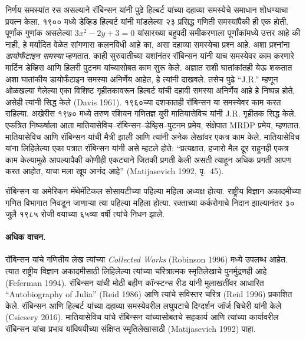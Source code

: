 निर्णय समस्यांत रस असल्याने रॉबिन्सन यांनी पुढे हिल्बर्ट यांच्या दहाव्या समस्येचे समाधान शोधण्याचा प्रयत्न केला. १९०० मध्ये डेव्हिड हिल्बर्ट यांनी मांडलेल्या २३ प्रसिद्ध गणिती समस्यांपैकी ही एक होती. पूर्णांक गुणांक असलेल्या $3x^2 - 2y +3 = 0$ यांसारख्या बहुपदी समीकरणाला पूर्णांकांमध्ये उत्तर आहे की नाही, हे मर्यादित वेळेत सांगणारा कलनविधी आहे का, असा दहाव्या समस्येचा प्रश्न आहे. अशा प्रश्नांना \emph{डायोफँटाइन समस्या} म्हणतात. काही सुरुवातीच्या यशांनंतर रॉबिन्सन यांनी याच समस्येवर काम करणारे मार्टिन डेव्हिस आणि हिलरी पुटनम यांच्यासोबत काम सुरू केले. अज्ञात राशी घातांकांतही येऊ शकतात अशा घातांकीय डायोफँटाइन समस्या अनिर्णेय आहेत, हे त्यांनी दाखवले. तसेच पुढे “J.R.” म्हणून ओळखल्या गेलेल्या एका विशिष्ट गृहीतकावरून हिल्बर्ट यांची दहावी समस्या अनिर्णेय आहे हे निष्पन्न होते, असेही त्यांनी सिद्ध केले (Davis 1961). १९६०च्या दशकातही रॉबिन्सन या समस्येवर काम करत राहिल्या. अखेरीस १९७० मध्ये तरुण रशियन गणितज्ञ युरी मातियासेविच यांनी J.R. गृहीतक सिद्ध केले. एकत्रित निष्कर्षाला आता मातियासेविच–रॉबिन्सन–डेव्हिस–पुटनम प्रमेय, संक्षेपात MRDP प्रमेय, म्हणतात. मातियासेविच आणि रॉबिन्सन यांची मैत्री झाली आणि त्यांनी अनेक लेखांवर एकत्र काम केले. मातियासेविच यांना लिहिलेल्या एका पत्रात रॉबिन्सन यांनी असे म्हटले होते: “प्रत्यक्षात, हजारो मैल दूर राहूनही एकत्र काम केल्यामुळे आपल्यापैकी कोणीही एकट्याने जितकी प्रगती केली असती त्याहून अधिक प्रगती आपण करत आहोत, याचा मला खूप आनंद आहे” (Matijasevich 1992, पृ.~45).

रॉबिन्सन या अमेरिकन मॅथेमॅटिकल सोसायटीच्या पहिल्या महिला अध्यक्ष होत्या. राष्ट्रीय विज्ञान अकादमीच्या गणित विभागात निवडून जाणाऱ्या त्या पहिल्या महिला होत्या. रक्ताच्या कर्करोगाचे निदान झाल्यानंतर ३० जुलै १९८५ रोजी वयाच्या ६५व्या वर्षी त्यांचे निधन झाले.

\paragraph{अधिक वाचन.}
रॉबिन्सन यांचे गणितीय लेख त्यांच्या \textit{Collected Works} (Robinson 1996) मध्ये उपलब्ध आहेत. त्यात राष्ट्रीय विज्ञान अकादमीसाठी लिहिलेल्या त्यांच्या चरित्रात्मक स्मृतिलेखाचे पुनर्मुद्रणही आहे (Feferman 1994). रॉबिन्सन यांची मोठी बहीण कॉन्स्टन्स रीड यांनी मुलाखतींवर आधारित “Autobiography of Julia” (Reid 1986) आणि त्यांचे सविस्तर चरित्र (Reid 1996) प्रकाशित केले. रॉबिन्सन आणि हिल्बर्ट यांच्या दहाव्या समस्येवरील लघुपटाचे दिग्दर्शन जॉर्ज चिचेरी यांनी केले (Csicsery 2016). मातियासेविच यांचे रॉबिन्सन यांच्यासोबतचे सहकार्य आणि त्यांच्या कार्यावरील रॉबिन्सन यांचा प्रभाव यांविषयीच्या संक्षिप्त स्मृतिलेखासाठी (Matijasevich 1992) पाहा.














